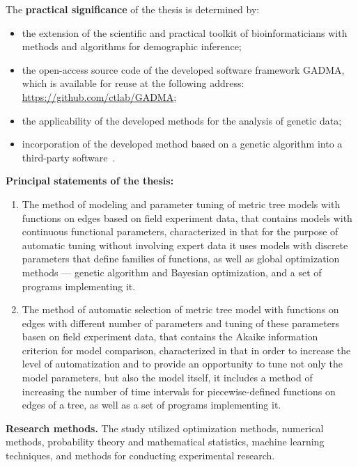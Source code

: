 The \textbf{practical significance} of the thesis is determined by:
\begin{itemize}
    \item the extension of the scientific and practical toolkit of bioinformaticians with methods and algorithms for demographic inference;
    \item the open-access source code of the developed software framework GADMA, which is available for reuse at the following address: \url{https://github.com/ctlab/GADMA};
    \item the applicability of the developed methods for the analysis of genetic data;
    \item incorporation of the developed method based on a genetic algorithm into a third-party software~\cite{rippe2021environmental}.\\
\end{itemize}

\newpage
\textbf{Principal statements of the thesis:}
\begin{enumerate}[label={\arabic*.}]
    \item The method of modeling and parameter tuning of metric tree models with functions on edges based on field experiment data, that contains models with continuous functional parameters, characterized in that for the purpose of automatic tuning without involving expert data it uses models with discrete parameters that define families of functions, as well as global optimization methods --- genetic algorithm and Bayesian optimization, and a set of programs implementing it.
    \item The method of automatic selection of metric tree model with functions on edges with different number of parameters and tuning of these parameters basen on field experiment data, that contains the Akaike information criterion for model comparison, characterized in that in order to increase the level of automatization and to provide an opportunity to tune not only the model parameters, but also the model itself, it includes a method of increasing the number of time intervals for piecewise-defined functions on edges of a tree, as well as a set of programs implementing it.
\end{enumerate}

\textbf{Research methods.} The study utilized optimization methods, numerical methods, probability theory and mathematical statistics, machine learning techniques, and methods for conducting experimental research.\\

